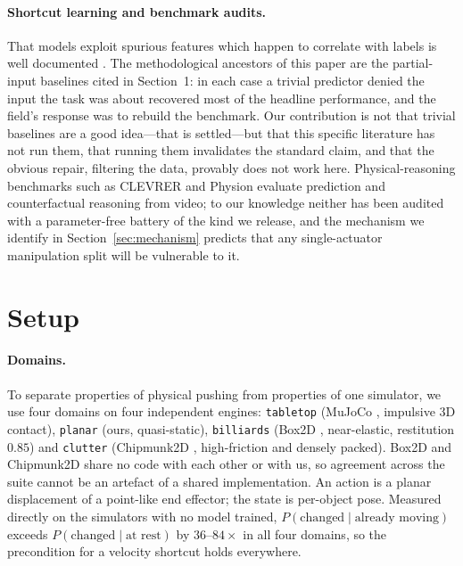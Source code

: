 \documentclass{article}
\begin{document}
\paragraph{Shortcut learning and benchmark audits.} That models exploit spurious features
which happen to correlate with labels is well documented
\citep{torralba2011bias,lapuschkin2019cleverhans,geirhos2020shortcut}. The methodological
ancestors of this paper are the partial-input baselines cited in Section~1: in each case a
trivial predictor denied the input the task was about recovered most of the headline
performance, and the field's response was to rebuild the benchmark. Our contribution is not
that trivial baselines are a good idea---that is settled---but that this specific literature
has not run them, that running them invalidates the standard claim, and that the obvious
repair, filtering the data, provably does not work here. Physical-reasoning benchmarks such as
CLEVRER and Physion \citep{yi2020clevrer,bear2021physion} evaluate prediction and counterfactual
reasoning from video; to our knowledge neither has been audited with a parameter-free battery
of the kind we release, and the mechanism we identify in Section~\ref{sec:mechanism} predicts
that any single-actuator manipulation split will be vulnerable to it.

\section{Setup}
\label{sec:setup}

\paragraph{Domains.} To separate properties of physical pushing from properties of one
simulator, we use four domains on four independent engines: \texttt{tabletop} (MuJoCo
\citep{todorov2012mujoco}, impulsive 3D contact), \texttt{planar} (ours, quasi-static),
\texttt{billiards} (Box2D \citep{catto2011box2d}, near-elastic, restitution $0.85$) and
\texttt{clutter} (Chipmunk2D \citep{lembcke2013chipmunk}, high-friction and densely packed).
Box2D and Chipmunk2D share no code with each other or with us, so agreement across the suite
cannot be an artefact of a shared implementation. An action is a planar displacement of a
point-like end effector; the state is per-object pose. Measured directly on the simulators with
no model trained, $P(\text{changed} \mid \text{already moving})$ exceeds
$P(\text{changed} \mid \text{at rest})$ by $36$--$84\times$ in all four domains, so the
precondition for a velocity shortcut holds everywhere.
\end{document}
